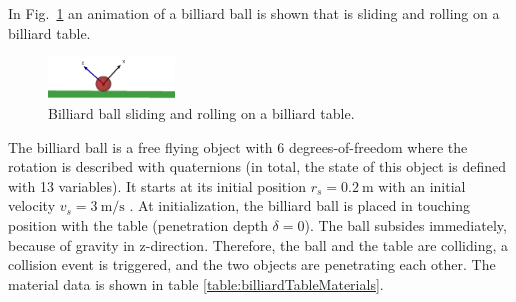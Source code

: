 In Fig.~\ref{fig:rollingBall} an animation of a billiard ball is shown that is sliding and rolling
on a billiard table. 
%
\begin{figure}[bt]
	\centering
	\includegraphics[width=0.3\textwidth]{figures/rollingBall.png}
	\caption{Billiard ball sliding and rolling on a billiard table.}
	\label{fig:rollingBall}
\end{figure}
%
The billiard ball is a free flying object with 6 degrees-of-freedom where the rotation is
described with quaternions (in total, the state of this object is defined with 13 variables). 
It starts at its initial position $r_s = \SI{0.2}{\meter}$ with an initial velocity $v_s = \SI{3}{\meter \per \second}$ . At initialization, the billiard ball is placed in touching position with the table (penetration depth $\delta = 0$). The ball subsides immediately, because of gravity in z-direction. Therefore, the ball and the table are colliding, a collision event is triggered, and the two objects are penetrating each other. The material data is shown in table \ref{table:billiardTableMaterials}.

